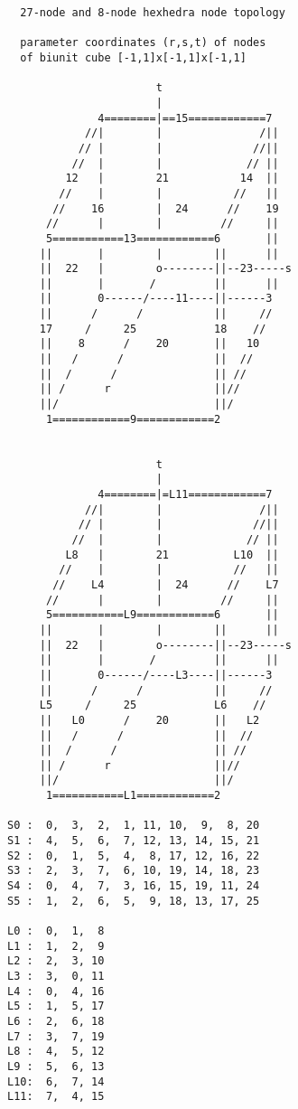 \begin{verbatim}
  27-node and 8-node hexhedra node topology

  parameter coordinates (r,s,t) of nodes
  of biunit cube [-1,1]x[-1,1]x[-1,1]

                       t
                       |
              4========|==15============7
            //|        |               /||
           // |        |              //||
          //  |        |             // ||
         12   |        21           14  ||
        //    |        |           //   ||
       //    16        |  24      //    19
      //      |        |         //     ||
      5===========13============6       ||
     ||       |        |        ||      ||
     ||  22   |        o--------||--23-----s
     ||       |       /         ||      ||
     ||       0------/----11----||------3
     ||      /      /           ||     //
     17     /     25            18    //
     ||    8      /    20       ||   10
     ||   /      /              ||  //
     ||  /      /               || //
     || /      r                ||//
     ||/                        ||/
      1============9============2


                       t
                       |
              4========|=L11============7
            //|        |               /||
           // |        |              //||
          //  |        |             // ||
         L8   |        21          L10  ||
        //    |        |           //   ||
       //    L4        |  24      //    L7
      //      |        |         //     ||
      5===========L9============6       ||
     ||       |        |        ||      ||
     ||  22   |        o--------||--23-----s
     ||       |       /         ||      ||
     ||       0------/----L3----||------3
     ||      /      /           ||     //
     L5     /     25            L6    //
     ||   L0      /    20       ||   L2
     ||   /      /              ||  //
     ||  /      /               || //
     || /      r                ||//
     ||/                        ||/
      1===========L1============2

S0 :  0,  3,  2,  1, 11, 10,  9,  8, 20
S1 :  4,  5,  6,  7, 12, 13, 14, 15, 21
S2 :  0,  1,  5,  4,  8, 17, 12, 16, 22
S3 :  2,  3,  7,  6, 10, 19, 14, 18, 23
S4 :  0,  4,  7,  3, 16, 15, 19, 11, 24
S5 :  1,  2,  6,  5,  9, 18, 13, 17, 25

L0 :  0,  1,  8
L1 :  1,  2,  9
L2 :  2,  3, 10
L3 :  3,  0, 11
L4 :  0,  4, 16
L5 :  1,  5, 17
L6 :  2,  6, 18
L7 :  3,  7, 19
L8 :  4,  5, 12
L9 :  5,  6, 13
L10:  6,  7, 14
L11:  7,  4, 15

\end{verbatim}
